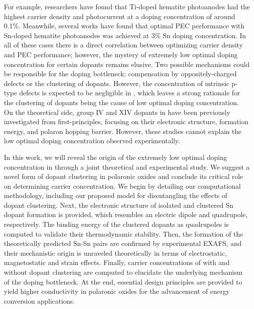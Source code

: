 For example, researchers\cite{fu2014highly,malviya2017influence} have found that Ti-doped hematite photoanodes had the highest carrier density and photocurrent at a doping concentration of around 0.1\%. Meanwhile, several works\cite{yang2013new,tian2020electronic,bindu2018electrical} have found that optimal PEC performance with Sn-doped hematite photoanodes was achieved at 3\% Sn doping concentration. In all of these cases there is a direct correlation between optimizing carrier density and PEC performance; however, the mystery of extremely low optimal doping concentration for certain dopants remains elusive.
Two possible mechanisms could be responsible for the doping bottleneck: compensation by oppositely-charged defects or the clustering of dopants.
However, the concentration of intrinsic p-type defects is expected to be negligible in \cite{lee2013thermodynamics}, which leaves a strong rationale for the clustering of dopants being the cause of low optimal doping concentration.
On the theoretical side, group IV and XIV dopants in  have been previously investigated from first-principles, focusing on their
electronic structure, formation energy, and polaron hopping barrier\cite{smart2017effect,zhou2019silicon,zhou2015understanding,liao2011electron}.
However, these studies cannot explain the low optimal doping concentration observed experimentally.

In this work, we will reveal the origin of the extremely low optimal doping concentration in  through a joint theoretical and experimental study. We suggest a novel form of dopant clustering in polaronic oxides and conclude its critical role on determining carrier concentration.
We begin by detailing our computational methodology, including our proposed model for disentangling the effects of dopant clustering.
Next, the electronic structure of isolated and clustered Sn dopant formation is provided, which resembles an electric dipole and quadrupole, respectively. The binding energy of the clustered dopants as quadrupoles is computed to validate their thermodynamic stability. Then, the formation of the theoretically predicted Sn-Sn pairs are confirmed by experimental EXAFS, and
their mechanistic origin is unraveled theoretically in terms of electrostatic, magnetostatic and strain effects.
Finally, carrier concentrations of  with and without dopant clustering are computed to elucidate the underlying mechanism of the doping bottleneck. At the end, essential design principles are provided to yield higher conductivity in polaronic oxides for the advancement of energy conversion applications.

